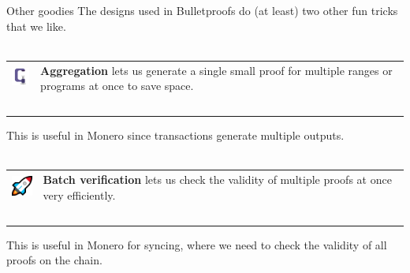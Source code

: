 \documentclass[aspectratio=169]{beamer}
\begin{document}
\begin{frame}{Other goodies}
    The designs used in Bulletproofs do (at least) two other fun tricks that we like. \\~\\

    \begin{tabular}{>{\arraybackslash}m{40px} >{\arraybackslash}m{320px}}
        \includegraphics[width=30px]{images/clamp.png} & \textbf{Aggregation} lets us generate a single small proof for multiple ranges or programs at once to save space. \\~\\
    \end{tabular}

    This is useful in Monero since transactions generate multiple outputs. \\~\\

    \begin{tabular}{>{\arraybackslash}m{40px} >{\arraybackslash}m{320px}}
        \includegraphics[width=30px]{images/rocket.png} & \textbf{Batch verification} lets us check the validity of multiple proofs at once very efficiently. \\~\\
    \end{tabular}

    This is useful in Monero for syncing, where we need to check the validity of all proofs on the chain.
\end{frame}
\end{document}
